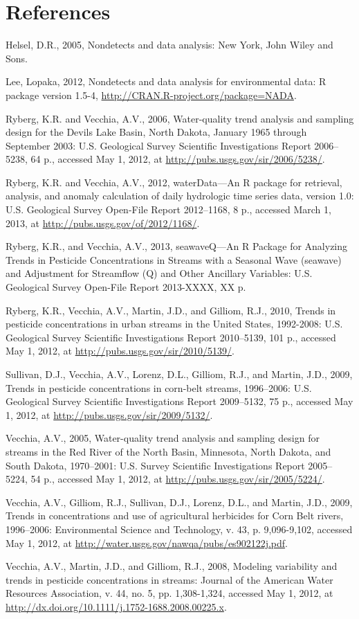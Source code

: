 \documentclass[11pt]{article}
\begin{document}
\section{References}
Helsel, D.R., 2005, Nondetects and data analysis: New York, John Wiley and Sons.

Lee, Lopaka, 2012, Nondetects and data analysis for environmental data: R package version 1.5-4,
\url{http://CRAN.R-project.org/package=NADA}.

Ryberg, K.R. and Vecchia, A.V., 2006, Water-quality trend analysis and sampling design for the Devils Lake Basin, North Dakota, January 1965 through September 2003: U.S. Geological Survey Scientific Investigations Report 2006--5238, 64 p.,  accessed May 1, 2012, at \url{http://pubs.usgs.gov/sir/2006/5238/}.

Ryberg, K.R. and Vecchia, A.V., 2012, waterData---An R package for retrieval, analysis, and anomaly calculation of daily hydrologic time series data, version 1.0: U.S. Geological Survey Open-File Report 2012--1168, 8 p., accessed March 1, 2013, at \url{http://pubs.usgs.gov/of/2012/1168/}.

Ryberg, K.R., and Vecchia, A.V., 2013, seawaveQ---An R Package for Analyzing Trends in Pesticide Concentrations in Streams with a Seasonal Wave (seawave) and Adjustment for Streamflow (Q) and Other Ancillary Variables: U.S. Geological Survey Open-File Report 2013-XXXX, XX p.

Ryberg, K.R., Vecchia, A.V., Martin, J.D., and Gilliom, R.J., 2010, Trends in pesticide concentrations in urban streams in the United States, 1992-2008: U.S. Geological Survey Scientific Investigations Report 2010--5139, 101 p.,  accessed May 1, 2012, at \url{http://pubs.usgs.gov/sir/2010/5139/}.

Sullivan, D.J., Vecchia, A.V., Lorenz, D.L., Gilliom, R.J., and Martin, J.D., 2009, Trends in pesticide concentrations in corn-belt streams, 1996--2006: U.S. Geological Survey Scientific Investigations Report 2009--5132, 75 p.,  accessed May 1, 2012, at \url{http://pubs.usgs.gov/sir/2009/5132/}.

Vecchia, A.V., 2005, Water-quality trend analysis and sampling design for streams in the Red River of the North Basin, Minnesota, North Dakota, and South Dakota, 1970--2001: U.S. Survey Scientific Investigations Report 2005--5224, 54 p., accessed May 1, 2012, at \url{http://pubs.usgs.gov/sir/2005/5224/}.

Vecchia, A.V., Gilliom, R.J., Sullivan, D.J., Lorenz, D.L., and Martin, J.D., 2009, Trends in concentrations and use of agricultural herbicides for Corn Belt rivers, 1996--2006:  Environmental Science and Technology, v. 43, p. 9,096-9,102, accessed May 1, 2012, at \url{http://water.usgs.gov/nawqa/pubs/es902122j.pdf}.

Vecchia, A.V., Martin, J.D., and Gilliom, R.J., 2008, Modeling variability and trends in pesticide concentrations in streams: Journal of the American Water Resources Association, v. 44, no. 5, pp. 1,308-1,324, accessed May 1, 2012, at \url{http://dx.doi.org/10.1111/j.1752-1688.2008.00225.x}.
\end{document}
